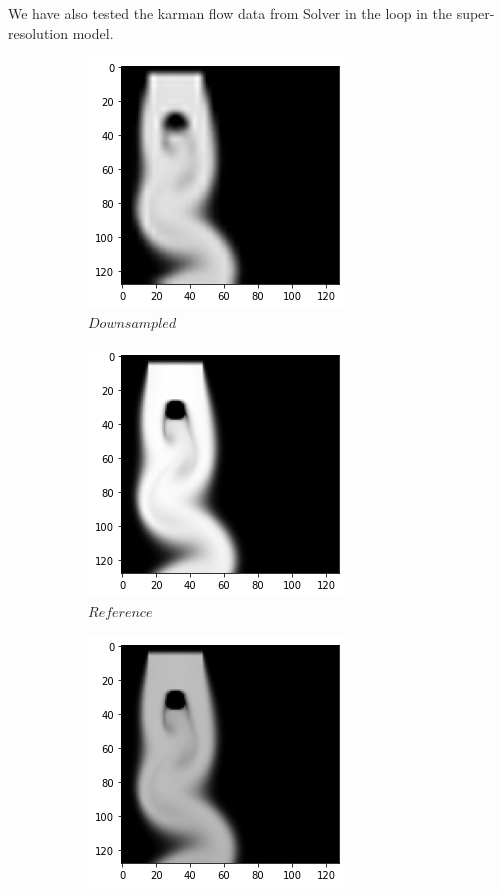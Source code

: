 \documentclass[a4paper,12pt,twoside]{report}
\begin{document}
We have also tested the karman flow data from Solver in the loop in the super-resolution model. 
\begin{figure}
	\centering
	\begin{subfigure}{0.32\textwidth}
		\centering
		\includegraphics[scale=0.5]{superresolution/karman_down.png}
		\caption{$Downsampled$}
	\end{subfigure}
	\begin{subfigure}{0.32\textwidth}
		\centering
		\includegraphics[scale=0.5]{superresolution/karman_ref.png}
		\caption{$Reference$}
	\end{subfigure}
	\begin{subfigure}{0.32\textwidth}
		\centering
		\includegraphics[scale=0.5]{superresolution/karman_mse.png}

\end{subfigure}
\end{figure}
\end{document}
